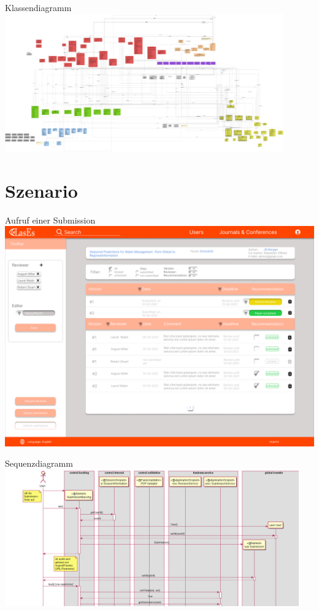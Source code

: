 \documentclass{beamer}
\begin{document}
    \begin{frame}{Klassendiagramm}
        \centering
        \includegraphics[width=0.9\textwidth]{../../docs/Entwurf/graphics/klassendiagramm_png.png}
    \end{frame}


    \section{Szenario}
    \begin{frame}{Aufruf einer Submission}
        \centering
        \includegraphics[width=\textwidth]{../../docs/Pflichtenheft/graphics/Submission-png.png}
    \end{frame}

    \begin{frame}{Sequenzdiagramm}
        \centering
        \includegraphics[width=0.95\textwidth]{excerpts/sequence1_1}
    \end{frame}
\end{document}
